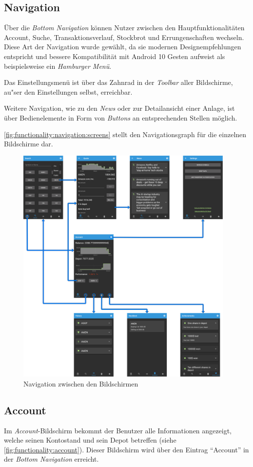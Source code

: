 \documentclass[a4paper]{article}
\begin{document}
\subsection{Navigation}
\label{subsec:functionality:navigation}
Über die \textit{Bottom Navigation} können Nutzer zwischen den Hauptfunktionalitäten Account, Suche, Transaktionsverlauf, Stockbrot und Errungenschaften wechseln.
Diese Art der Navigation wurde gewählt, da sie modernen Designempfehlungen \autocite{bottom_navigation} entspricht und bessere Kompatibilität mit Android 10 Gesten aufweist als beispielsweise ein \textit{Hamburger Menü}.

Das Einstellungsmenü ist über das Zahnrad in der \textit{Toolbar} aller Bildschirme, au"ser den Einstellungen selbst, erreichbar.

Weitere Navigation, wie zu den \textit{News} oder zur Detailansicht einer Anlage, ist über Bedienelemente in Form von \textit{Buttons} an entsprechenden Stellen möglich.

\autoref{fig:functionality:navigation:screens} stellt den Navigationsgraph für die einzelnen Bildschirme dar.
\begin{figure}[H]
	\centering
	\includegraphics[height=12cm]{./images/navigation_screens/navigation_screens.png}
	\caption{Navigation zwischen den Bildschirmen}
	\label{fig:functionality:navigation:screens}
\end{figure}


\subsection{Account}
\label{subsec:functionality:account}
Im \textit{Account}-Bildschirm bekommt der Benutzer alle Informationen angezeigt, welche seinen Kontostand und sein Depot betreffen (siehe \autoref{fig:functionality:account}).
Dieser Bildschirm wird über den Eintrag "`Account"' in der \textit{Bottom Navigation} erreicht.
\end{document}
